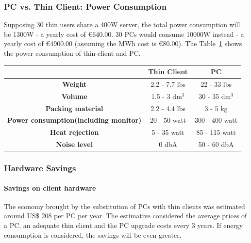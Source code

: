            \subsubsection*{PC vs. Thin Client: Power Consumption}
                Supposing 30 thin users share a 400W server, the total power consumption will be 1300W - a yearly cost of \euro640.00. 30 PCs would consume 10000W instead - a yearly cost of \euro4900.00 (assuming the MWh cost is \euro80.00). The Table~\ref{tab:pc_thin_client_power_consumption} shows the power consumption of thin-client and PC.
                \begin{table}
                \centering
                    \begin{tabular}{|c|c|c|}
                    \hline
                        {\bf } & {\bf Thin Client} &   {\bf PC} \\
                    \hline
                    {\bf Weight} & 2.2 - 7.7 lbs & 22 - 33 lbs \\
                    \hline
                    {\bf Volume} & 1.5 - 3 dm$^3$ & 30 - 35 dm$^3$ \\
                    \hline
                    {\bf Packing material} & 2.2 - 4.4 lbs &   3 - 5 kg \\
                    \hline
                    {\bf Power consumption\linebreak (including monitor)} & 20 - 50 watt & 300 - 400 watt \\
                    \hline
                    {\bf Heat rejection} & 5 - 35 watt & 85 - 115 watt \\
                    \hline
                    {\bf Noise level} & 0 dbA & 50 - 60 dbA \\
                    \hline
                    \end{tabular}  
                    \label{tab:pc_thin_client_power_consumption}
                \end{table}
                
            \subsubsection*{Hardware Savings}
                \paragraph*{Savings on client hardware} 
                    The economy brought by the substitution of PCs with thin clients was estimated around US\$ 208 per PC per year. The estimative considered the average prices of a PC, an adequate thin client and the PC upgrade costs every 3 years. If energy consumption is considered, the savings will be even greater.

